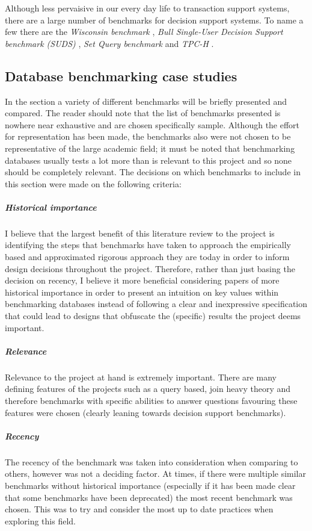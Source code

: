 Although less pervaisive in our every day life to transaction support systems,
there are a large number of benchmarks for decision support systems. To name a
few there are the \emph{Wisconsin benchmark} \cite{Wisconsin}, \emph{Bull Single-User Decision
Support benchmark (SUDS)} \cite{PractitionersIntroduction}, \emph{Set Query
benchmark} \cite{SetQueryBenchmark} and \emph{TPC-H} \cite{TPC-H}. 

\subsection{Database benchmarking case studies}
In the section a variety of different benchmarks will be briefly presented and
compared. The reader should note that the list of benchmarks presented is
nowhere near exhaustive and are chosen specifically sample. Although the effort
for representation has been made, the benchmarks also were not chosen to be
representative of the large academic field; it must be noted that benchmarking
databases usually tests a lot more than is relevant to this project and so none
should be completely relevant. The decisions on which benchmarks to include in
this section were made on the following criteria:
\subparagraph{Historical importance}\label{enum:historicalImportance} I believe that the largest benefit of this
literature review to the project is identifying the steps that benchmarks have
taken to approach the empirically based and approximated rigorous approach they
are today in order to inform design decisions throughout the project. Therefore,
rather than just basing the decision on recency, I believe it more beneficial
considering papers of more historical importance in order to present an
intuition on key values within benchmarking databases instead of following a
clear and inexpressive specification that could lead to designs that obfuscate
the (specific) results the project deems important. 
\subparagraph{Relevance} Relevance to the project at hand is extremely
important. There are many defining features of the projects such as a query
based, join heavy theory and therefore benchmarks with specific abilities to
answer questions favouring these features were chosen (clearly leaning towards
decision support benchmarks).
\subparagraph{Recency} The recency of the benchmark was taken into consideration
when comparing to others, however was not a deciding factor. At times, if there
were multiple similar benchmarks without historical importance (especially if
it has been made clear that some benchmarks have been deprecated) the most
recent benchmark was chosen. This was to try and consider the most up to date
practices when exploring this field.

